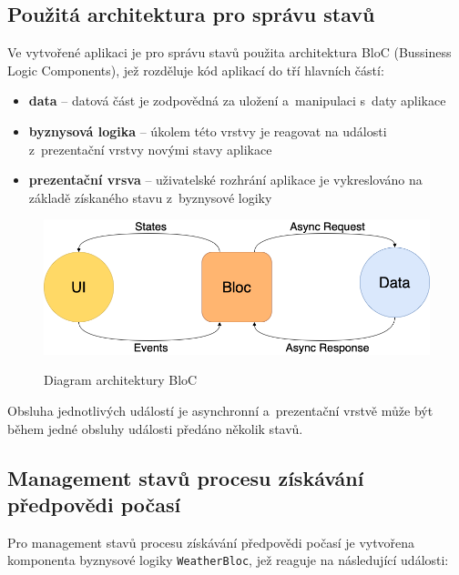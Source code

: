 \documentclass[12pt, a4paper]{article}
\begin{document}
\subsection{Použitá architektura pro správu stavů}

Ve vytvořené aplikaci je pro správu stavů použita architektura BloC (Bussiness Logic Components), jež rozděluje kód aplikací do tří hlavních částí:
\begin{itemize}
        \item \textbf{data} -- datová část je zodpovědná za uložení a~manipulaci s~daty aplikace
        \item \textbf{byznysová logika} -- úkolem této vrstvy je reagovat na události z~prezentační vrstvy novými stavy aplikace
        \item \textbf{prezentační vrsva} -- uživatelské rozhrání aplikace je vykreslováno na základě získaného stavu z~byznysové logiky
\end{itemize}

\begin{figure}[!ht]
\centering
{\includegraphics[width=13.5cm]{img/bloc-architecture.png}}
\caption{Diagram architektury BloC}
\label{fig:vrp-recognition-diagram}
\end{figure}

Obsluha jednotlivých událostí je asynchronní a~prezentační vrstvě může být během jedné obsluhy události předáno několik stavů.


\subsection{Management stavů procesu získávání předpovědi počasí}

Pro management stavů procesu získávání předpovědi počasí je vytvořena komponenta byznysové logiky \texttt{WeatherBloc}, jež reaguje na následující události:
\end{document}
